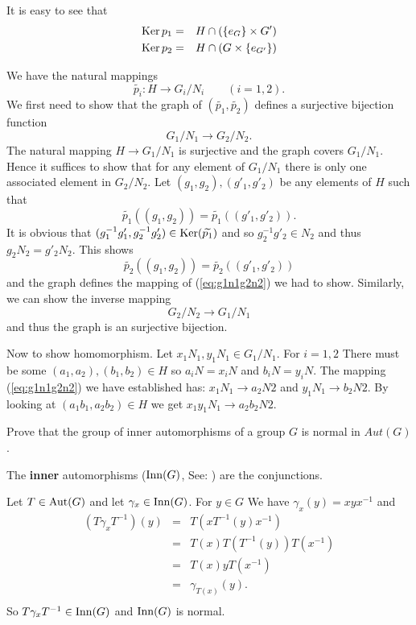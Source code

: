 \documentclass[12pt]{book}
\def\Aut{\mathop{\rm Aut}\nolimits}
\def\Inn{\mathop{\rm Inn}\nolimits}
\def\Ker{\mathop{\rm Ker}\nolimits}
\newcounter{myenumi}
\newenvironment{myenumerate}
{\begin{enumerate}
 \setcounter{enumi}{\themyenumi}
}
{\setcounter{myenumi}{\theenumi}
 \end{enumerate}}
\begin{document}
\begin{myenumerate}
It is easy to see that
\begin{eqnarray*}
\Ker{p_1} & = & H \cap (\{e_G\}\times G')\\
\Ker{p_2} & = & H \cap (G\times\{e_{G'}\})\\
\end{eqnarray*}

We have the natural mappings
\[\widetilde{p_i}: H \rightarrow G_i/N_i\qquad(i=1,2).\]
We first need to show that the graph of \((\widetilde{p_1},\widetilde{p_2})\)
defines a surjective bijection function
\begin{equation}\label{eq:g1n1g2n2}
G_1/N_1 \rightarrow G_2/N_2.
\end{equation}
The natural mapping \(H\rightarrow G_1/N_1\) is surjective
and the graph covers \(G_1/N_1\).
Hence it suffices to show that for any element of \(G_1/N_1\)
there is only one associated element in \(G_2/N_2\).
Let
\((g_1,g_2),(g'_1,g'_2)\) be any elements of $H$ such that
\[\widetilde{p_1}((g_1,g_2)) = \widetilde{p_1}((g'_1,g'_2)).\]
It is obvious that
\((g_1^{-1}g'_1,g_2^{-1}g'_2) \in \Ker(\widetilde{p_1})\)
and so \(g_2^{-1}g'_2\in N_2\) and thus \(g_2 N_2 = g'_2 N_2\).
This shows
\[\widetilde{p_2}(\left(g_1,g_2\right)) =
  \widetilde{p_2}(\left(g'_1,g'_2\right))\]
and the graph defines the mapping of (\ref{eq:g1n1g2n2}) we had to show.
Similarly, we can show the inverse mapping
\[G_2/N_2 \rightarrow G_1/N_1\]
and thus the graph is an surjective bijection.

Now to show homomorphism. Let
\(x_1N_1,y_1N_1 \in G_1/N_1\).
For \(i=1,2\)
There must be some
\((a_1,a_2),(b_1,b_2)\in H\) so
\(a_iN = x_iN\) and
\(b_iN = y_iN\).
The mapping (\ref{eq:g1n1g2n2}) we have established has:
\(x_1N_1 \rightarrow a_2N2\) and
\(y_1N_1 \rightarrow b_2N2\).
By looking at
\((a_1 b_1,a_2 b_2)\in H\) we get
\(x_1 y_1 N_1 \rightarrow a_2 b_2 N2\).


\begin{excopy}
Prove that the group of inner automorphisms of a group $G$
is normal in \(Aut(G)\).
\end{excopy}

The \textbf{inner} automorphisms
(\(\Inn(G)\), See: \cite{Scott87})
are the conjunctions.

Let \(T\in \Aut(G)\) and
let \(\gamma_x\in \Inn(G)\).
For \(y\in G\) We have
\(\gamma_x(y) = xyx^{-1}\) and
\begin{eqnarray*}
(T\gamma_x T^{-1})(y)
  & = & T(xT^{-1}(y)x^{-1})\\
  & = & T(x)T(T^{-1}(y))T(x^{-1})\\
  & = & T(x)yT(x^{-1})\\
  & = & \gamma_{T(x)}(y).\\
\end{eqnarray*}
So \(T\gamma_x T^{-1} \in \Inn(G)\) and \(\Inn(G)\) is normal.


\end{myenumerate}
\end{document}
